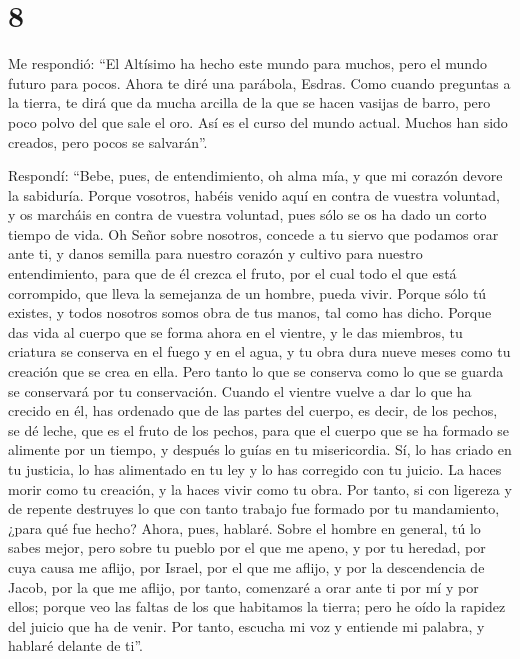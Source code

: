 \hypertarget{section-7}{%
\section{8}\label{section-7}}

 Me respondió: ``El Altísimo ha hecho este mundo para
muchos, pero el mundo futuro para pocos.  Ahora te diré
una parábola, Esdras. Como cuando preguntas a la tierra, te dirá que da
mucha arcilla de la que se hacen vasijas de barro, pero poco polvo del
que sale el oro. Así es el curso del mundo actual.  Muchos
han sido creados, pero pocos se salvarán''.

 Respondí: ``Bebe, pues, de entendimiento, oh alma mía, y
que mi corazón devore la sabiduría.  Porque vosotros,
habéis venido aquí en contra de vuestra voluntad, y os marcháis en
contra de vuestra voluntad, pues sólo se os ha dado un corto tiempo de
vida.  Oh Señor sobre nosotros, concede a tu siervo que
podamos orar ante ti, y danos semilla para nuestro corazón y cultivo
para nuestro entendimiento, para que de él crezca el fruto, por el cual
todo el que está corrompido, que lleva la semejanza de un hombre, pueda
vivir.  Porque sólo tú existes, y todos nosotros somos
obra de tus manos, tal como has dicho.  Porque das vida al
cuerpo que se forma ahora en el vientre, y le das miembros, tu criatura
se conserva en el fuego y en el agua, y tu obra dura nueve meses como tu
creación que se crea en ella.  Pero tanto lo que se
conserva como lo que se guarda se conservará por tu conservación. Cuando
el vientre vuelve a dar lo que ha crecido en él,  has
ordenado que de las partes del cuerpo, es decir, de los pechos, se dé
leche, que es el fruto de los pechos,  para que el cuerpo
que se ha formado se alimente por un tiempo, y después lo guías en tu
misericordia.  Sí, lo has criado en tu justicia, lo has
alimentado en tu ley y lo has corregido con tu juicio. 
La haces morir como tu creación, y la haces vivir como tu obra.
 Por tanto, si con ligereza y de repente destruyes lo que
con tanto trabajo fue formado por tu mandamiento, ¿para qué fue hecho?
 Ahora, pues, hablaré. Sobre el hombre en general, tú lo
sabes mejor, pero sobre tu pueblo por el que me apeno,  y
por tu heredad, por cuya causa me aflijo, por Israel, por el que me
aflijo, y por la descendencia de Jacob, por la que me aflijo,
 por tanto, comenzaré a orar ante ti por mí y por ellos;
porque veo las faltas de los que habitamos la tierra; 
pero he oído la rapidez del juicio que ha de venir.  Por
tanto, escucha mi voz y entiende mi palabra, y hablaré delante de ti''.

